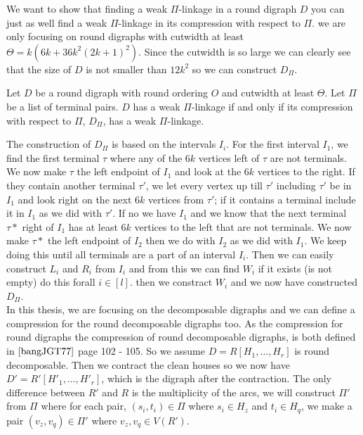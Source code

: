 We want to show that finding a weak $\Pi$-linkage in a round digraph $D$ you can just as well find a weak $\Pi$-linkage in its compression with respect to $\Pi$. 
we are only focusing on round digraphs with cutwidth at least $\Theta =k(6k+36k^2(2k+1)^2)$.
Since the cutwidth is so large we can clearly see that the size of $D$ is not smaller than $12k^2$ so we can construct $D_{\Pi}$.

\begin{lemma}
    Let $D$ be a round digraph with round ordering $O$ and cutwidth at least $\Theta$. 
    Let $\Pi$ be a list of terminal pairs. 
    $D$ has a weak $\Pi$-linkage if and only if its compression with respect to $\Pi$, $D_{\Pi}$, has a weak $\Pi$-linkage.
    \label{lemma:iwanttoprove}
\end{lemma} 

The construction of $D_{\Pi}$ is based on the intervals $I_i$. 
For the first interval $I_1$, we find the first terminal $\tau$ where any of the $6k$ vertices left of $\tau$ are not terminals.
We now make $\tau$ the left endpoint of $I_1$ and look at the $6k$ vertices to the right. 
If they contain another terminal $\tau '$, we let every vertex up till $\tau '$ including $\tau '$ be in $I_1$ and look right on the next $6k$ vertices from $\tau '$; if it contains a terminal include it in $I_1$ as we did with $\tau '$. 
If no we have $I_1$ and we know that the next terminal $\tau *$ right of $I_1$ has at least $6k$ vertices to the left that are not terminals. We now make $\tau *$ the left endpoint of $I_2$ then we do with $I_2$ as we did with $I_1$.
We keep doing this until all terminals are a part of an interval $I_i$.
Then we can easily construct $L_i$ and $R_i$ from $I_i$ and from this we can find $W_i$ if it exists (is not empty) do this forall $i\in [l]$. then we constract $W_i$ and we now have constructed $D_\Pi$. \\
In this thesis, we are focusing on the decomposable digraphs and we can define a compression for the round decomposable digraphs too. 
As the compression for round digraphs the compression of round decomposable digraphs, is both defined in $\cite{bangJGT77}$ page 102 - 105.
So we assume $D=R[H_1,\dots ,H_r]$ is round decomposable. 
Then we contract the clean houses so we now have $D'=R'[H'_1,\dots ,H'_r]$, which is the digraph after the contraction. 
The only difference between $R'$ and $R$ is the multiplicity of the arcs, we will construct $\Pi '$ from $\Pi$ where for each pair, $(s_i,t_i)\in \Pi$ where $s_i\in H_z$ and $t_i\in H_q$, we make a pair $(v_z,v_q)\in \Pi'$ where $v_z,v_q\in V(R')$.
